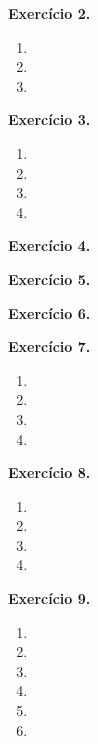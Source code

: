 \documentclass[12pt,a4paper]{article}
\begin{document}
\vspace{0.5cm}
\noindent\textbf{Exercício 2.}
\begin{enumerate}
    \renewcommand{\theenumi}{\alph{enumi}}
    \renewcommand{\labelenumi}{\theenumi)}
    \item 
    \item 
    \item 
\end{enumerate}

\vspace{0.5cm}
\noindent\textbf{Exercício 3.}
\begin{enumerate}
    \renewcommand{\theenumi}{\alph{enumi}}
    \renewcommand{\labelenumi}{\theenumi)}
    \item 
    \item 
    \item 
    \item 
\end{enumerate}

\vspace{0.5cm}
\noindent\textbf{Exercício 4.}

\vspace{0.5cm}
\noindent\textbf{Exercício 5.}

\vspace{0.5cm}
\noindent\textbf{Exercício 6.}

\vspace{0.5cm}
\noindent\textbf{Exercício 7.}
\begin{enumerate}
    \renewcommand{\theenumi}{\alph{enumi}}
    \renewcommand{\labelenumi}{\theenumi)}
    \item 
    \item 
    \item 
    \item 
\end{enumerate}

\vspace{0.5cm}
\noindent\textbf{Exercício 8.}
\begin{enumerate}
    \renewcommand{\theenumi}{\alph{enumi}}
    \renewcommand{\labelenumi}{\theenumi)}
    \item 
    \item 
    \item 
    \item 
\end{enumerate}

\vspace{0.5cm}
\noindent\textbf{Exercício 9.}
\begin{enumerate}
    \renewcommand{\theenumi}{\alph{enumi}}
    \renewcommand{\labelenumi}{\theenumi)}
    \item 
    \item 
    \item 
    \item 
    \item 
    \item 
\end{enumerate}
\end{document}
